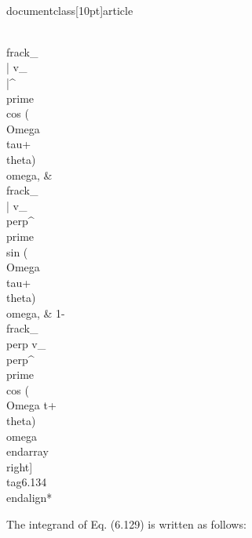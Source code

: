 \\documentclass[10pt]{article}
\begin{document}
{{{{\\frac{k_{\\|} v_{\\|}^{\\prime} \\cos (\\Omega \\tau+\\theta)}{\\omega}, & \\frac{k_{\\|} v_{\\perp}^{\\prime} \\sin (\\Omega \\tau+\\theta)}{\\omega}, & 1-\\frac{k_{\\perp} v_{\\perp}^{\\prime} \\cos (\\Omega t+\\theta)}{\\omega}
\\end{array}\\right] \\tag{6.134}
\\end{align*}


The integrand of Eq. (6.129) is written as follows:


}}}}
\end{document}
